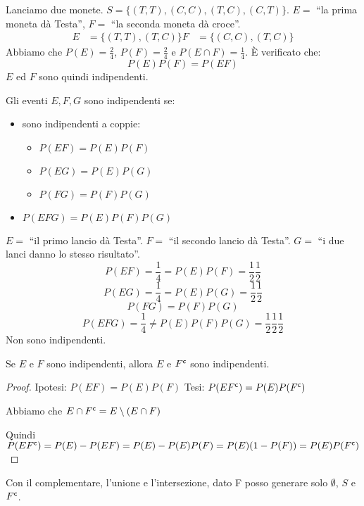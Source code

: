 \begin{exmp}
Lanciamo due monete. $S = \{ (T, T), (C, C), (T, C), (C, T) \}$. $E =$ ``la prima moneta d\`a Testa'', $F =$ ``la seconda moneta d\`a croce''.
\begin{align*}
E &= \{(T, T), (T, C)\}
F &= \{(C, C), (T, C)\}
\end{align*}
Abbiamo che $P(E) = \frac{2}{4}$, $P(F) = \frac{2}{4}$ e $P(E \cap F) = \frac{1}{4}$. \`E verificato che:
\[
P(E) P(F) = P(E F)
\]
$E$ ed $F$ sono quindi indipendenti.
\end{exmp}

\begin{defn}
Gli eventi $E, F, G$ sono indipendenti se:
\begin{itemize}
    \item sono indipendenti a coppie:
    \begin{itemize}
        \item $P(E F) = P(E) P(F)$
        \item $P(E G) = P(E) P(G)$
        \item $P(F G) = P(F) P(G)$
    \end{itemize}
    \item $P(EFG) = P(E) P(F) P(G)$
\end{itemize}
\end{defn}

\begin{exmp}
$E =$ ``il primo lancio d\`a Testa''.
$F =$ ``il secondo lancio d\`a Testa''.
$G =$ ``i due lanci danno lo stesso risultato''.
\[
P(E F) = \frac{1}{4} = P(E) P(F) = \frac{1}{2} \frac{1}{2}
\]
\[
P(E G) = \frac{1}{4} = P(E) P(G) = \frac{1}{2} \frac{1}{2}
\]
\[
P(F G) = P(F) P(G)
\]
\[
P(E F G) = \frac{1}{4} \neq P(E) P(F) P(G) = \frac{1}{2} \frac{1}{2} \frac{1}{2}
\]
Non sono indipendenti.
\end{exmp}

\begin{prop}
Se $E$ e $F$ sono indipendenti, allora $E$ e $F^{\mathsf{c}}$ sono indipendenti.
\end{prop}
\begin{proof}
Ipotesi: $P(E F) = P(E) P(F)$
Tesi: $P(E F^{\mathsf{c}}) = P(E) P(F^{\mathsf{c}})$

Abbiamo che $E \cap F^{\mathsf{c}} = E \setminus (E \cap F)$

Quindi $P(E F^{\mathsf{c}}) = P(E) - P(EF) = P(E) - P(E) P(F) = P(E) (1 - P(F)) = P(E) P(F^{\mathsf{c}})$
\end{proof}
Con il complementare, l'unione e l'intersezione, dato F posso generare solo $\emptyset$, $S$ e $F^{\mathsf{c}}$.


